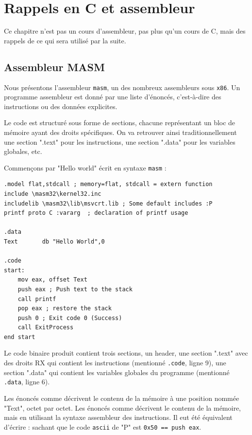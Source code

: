 \documentclass{book}
\newcommand{\code}[1]{\texttt{#1}}
\newcommand{\xquatre}{{\tt x86}\xspace}
\begin{document}
\chapter{Rappels en C et assembleur}

Ce chapitre n'est pas un cours d'assembleur, pas plus qu'un cours de C, mais des rappels de ce qui sera utilisé par la suite. 

\section{Assembleur MASM}

Nous présentons l'assembleur {\tt masm}, un des nombreux assembleurs sous \xquatre. Un programme assembleur est donné par une liste d'énoncés, c'est-à-dire des instructions ou des données explicites. 

Le code est structuré sous forme de sections, chacune représentant un bloc de mémoire ayant des droits spécifiques. On va retrouver ainsi traditionnellement une section ".text" pour les instructions, une section ".data" pour les variables globales, etc. 

Commençons par "Hello world" écrit en syntaxe {\tt masm} :

\begin{verbatim}
.model flat,stdcall ; memory=flat, stdcall = extern function
include \masm32\kernel32.inc
includelib \masm32\lib\msvcrt.lib ; Some default includes :P
printf proto C :vararg 	; declaration of printf usage

.data
Text       db "Hello World",0

.code
start:
	mov eax, offset Text
	push eax ; Push text to the stack
	call printf 
	pop eax ; restore the stack
	push 0 ; Exit code 0 (Success)
	call ExitProcess
end start
\end{verbatim}

Le code binaire produit contient trois sections, un header, une section ".text" avec des droits RX qui contient les instructions (mentionné \code{.code}, ligne 9), une section ".data" qui contient les variables globales du programme (mentionné \code{.data}, ligne 6). 

Les énoncés comme 
 décrivent le contenu de la mémoire à une position nommée "Text", octet par octet. 
Les énoncés comme  décrivent le contenu de la mémoire, mais en utilisant la syntaxe assembleur des instructions. Il eut été équivalent d'écrire : 
sachant que le code {\tt ascii} de "P" est \code{0x50 == push eax}. 
\end{document}

